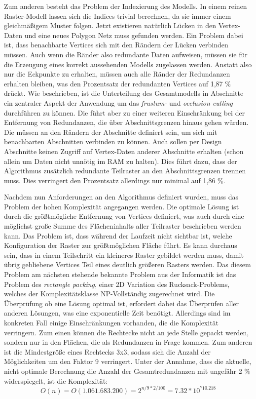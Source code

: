 Zum anderen besteht das Problem der Indexierung des Modells. In einem reinen Raster-Modell lassen sich die Indices trivial berechnen, da sie immer einem gleichmäßigem Muster folgen. Jetzt existieren natürlich Lücken in den Vertex-Daten und eine neues Polygon Netz muss gefunden werden. Ein Problem dabei ist, dass benachbarte Vertices sich mit den Rändern der Lücken verbinden müssen. Auch wenn die Ränder also redundante Daten aufweisen, müssen sie für die Erzeugung eines korrekt aussehenden Modells zugelassen werden. Anstatt also nur die Eckpunkte zu erhalten, müssen auch alle Ränder der Redundanzen erhalten bleiben, was den Prozentsatz der redundanten Vertices auf 1,87 \% drückt. Wie beschrieben, ist die Unterteilung des Gesamtmodells in Abschnitte ein zentraler Aspekt der Anwendung um das \textit{frustum-} und \textit{occlusion culling} durchführen zu können. Die führt aber zu einer weiteren Einschränkung bei der Entfernung von Redundanzen, die über Abschnittsgrenzen hinaus gehen würden. Die müssen an den Rändern der Abschnitte definiert sein, um sich mit benachbarten Abschnitten verbinden zu können. Auch sollen per Design Abschnitte keinen Zugriff auf Vertex-Daten anderer Abschnitte erhalten (schon allein um Daten nicht unnötig im RAM zu halten). Dies führt dazu, dass der Algorithmus zusätzlich redundante Teilraster an den Abschnittsgrenzen trennen muss. Dies verringert den Prozentsatz allerdings nur minimal auf 1,86 \%.

Nachdem nun Anforderungen an den Algorithmus definiert wurden, muss das Problem der hohen Komplexität angegangen werden. Die optimale Lösung ist durch die größtmögliche Entfernung von Vertices definiert, was auch durch eine möglichst große Summe des Flächeninhalts aller Teilraster beschrieben werden kann. Das Problem ist, dass während der Laufzeit nicht sichtbar ist, welche Konfiguration der Raster zur größtmöglichen Fläche führt. Es kann durchaus sein, dass in einem Teilschritt ein kleineres Raster gebildet werden muss, damit übrig gebliebene Vertices Teil eines deutlich größeren Rasters werden. Das diesem Problem am nächsten stehende bekannte Problem aus der Informatik ist das Problem des \textit{rectangle packing}, einer 2D Variation des Rucksack-Problems, welches der Komplexitätsklasse NP-Vollständig zugerechnet wird. Die Überprüfung ob eine Lösung optimal ist, erfordert dabei das Überprüfen aller anderen Lösungen, was eine exponentielle Zeit benötigt. Allerdings sind im konkreten Fall einige Einschränkungen vorhanden, die die Komplexität verringern. Zum einen können die Rechtecke nicht an jede Stelle gepackt werden, sondern nur in den Flächen, die als Redundanzen in Frage kommen. Zum anderen ist die Mindestgröße eines Rechtecks 3x3, sodass sich die Anzahl der Möglichkeiten um den Faktor 9 verringert. Unter der Annahme, dass die aktuelle, nicht optimale Berechnung die Anzahl der Gesamtredundanzen mit ungefähr 2 \% widerspiegelt, ist die Komplexität: \[O(n) = O(1.061.683.200) = 2^{n / 9 * 2 / 100} = 7.32 * 10^{710.218}\]

